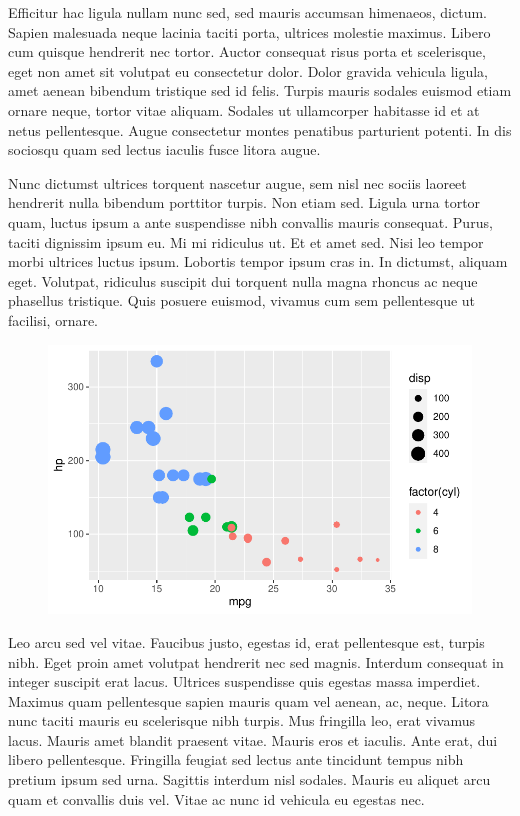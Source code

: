\documentclass[
  9pt,
  letterpaper,
  DIV=11,
  numbers=noendperiod]{scrartcl}
\begin{document}
Efficitur hac ligula nullam nunc sed, sed mauris accumsan himenaeos,
dictum. Sapien malesuada neque lacinia taciti porta, ultrices molestie
maximus. Libero cum quisque hendrerit nec tortor. Auctor consequat risus
porta et scelerisque, eget non amet sit volutpat eu consectetur dolor.
Dolor gravida vehicula ligula, amet aenean bibendum tristique sed id
felis. Turpis mauris sodales euismod etiam ornare neque, tortor vitae
aliquam. Sodales ut ullamcorper habitasse id et at netus pellentesque.
Augue consectetur montes penatibus parturient potenti. In dis sociosqu
quam sed lectus iaculis fusce litora augue.

Nunc dictumst ultrices torquent nascetur augue, sem nisl nec sociis
laoreet hendrerit nulla bibendum porttitor turpis. Non etiam sed. Ligula
urna tortor quam, luctus ipsum a ante suspendisse nibh convallis mauris
consequat. Purus, taciti dignissim ipsum eu. Mi mi ridiculus ut. Et et
amet sed. Nisi leo tempor morbi ultrices luctus ipsum. Lobortis tempor
ipsum cras in. In dictumst, aliquam eget. Volutpat, ridiculus suscipit
dui torquent nulla magna rhoncus ac neque phasellus tristique. Quis
posuere euismod, vivamus cum sem pellentesque ut facilisi, ornare.

\begin{figure}\includegraphics{man_files/figure-pdf/fig-mtcars-wrapfig-1}

\end{figure}

Leo arcu sed vel vitae. Faucibus justo, egestas id, erat pellentesque
est, turpis nibh. Eget proin amet volutpat hendrerit nec sed magnis.
Interdum consequat in integer suscipit erat lacus. Ultrices suspendisse
quis egestas massa imperdiet. Maximus quam pellentesque sapien mauris
quam vel aenean, ac, neque. Litora nunc taciti mauris eu scelerisque
nibh turpis. Mus fringilla leo, erat vivamus lacus. Mauris amet blandit
praesent vitae. Mauris eros et iaculis. Ante erat, dui libero
pellentesque. Fringilla feugiat sed lectus ante tincidunt tempus nibh
pretium ipsum sed urna. Sagittis interdum nisl sodales. Mauris eu
aliquet arcu quam et convallis duis vel. Vitae ac nunc id vehicula eu
egestas nec.
\end{document}
